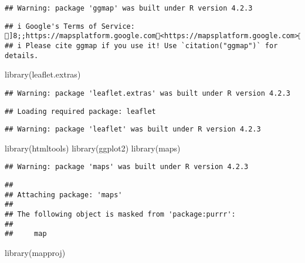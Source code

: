 \documentclass[
]{article}
\newenvironment{Shaded}{\begin{snugshade}}{\end{snugshade}}
\newcommand{\FunctionTok}[1]{\textcolor[rgb]{0.00,0.00,0.00}{#1}}
\newcommand{\NormalTok}[1]{#1}
\begin{document}
\begin{verbatim}
## Warning: package 'ggmap' was built under R version 4.2.3
\end{verbatim}

\begin{verbatim}
## i Google's Terms of Service: ]8;;https://mapsplatform.google.com<https://mapsplatform.google.com>]8;;
## i Please cite ggmap if you use it! Use `citation("ggmap")` for details.
\end{verbatim}

\begin{Shaded}
\begin{Highlighting}[]
\FunctionTok{library}\NormalTok{(leaflet.extras)}
\end{Highlighting}
\end{Shaded}

\begin{verbatim}
## Warning: package 'leaflet.extras' was built under R version 4.2.3
\end{verbatim}

\begin{verbatim}
## Loading required package: leaflet
\end{verbatim}

\begin{verbatim}
## Warning: package 'leaflet' was built under R version 4.2.3
\end{verbatim}

\begin{Shaded}
\begin{Highlighting}[]
\FunctionTok{library}\NormalTok{(htmltools)}
\FunctionTok{library}\NormalTok{(ggplot2)}
\FunctionTok{library}\NormalTok{(maps)}
\end{Highlighting}
\end{Shaded}

\begin{verbatim}
## Warning: package 'maps' was built under R version 4.2.3
\end{verbatim}

\begin{verbatim}
## 
## Attaching package: 'maps'
## 
## The following object is masked from 'package:purrr':
## 
##     map
\end{verbatim}

\begin{Shaded}
\begin{Highlighting}[]
\FunctionTok{library}\NormalTok{(mapproj)}
\end{Highlighting}
\end{Shaded}
\end{document}

